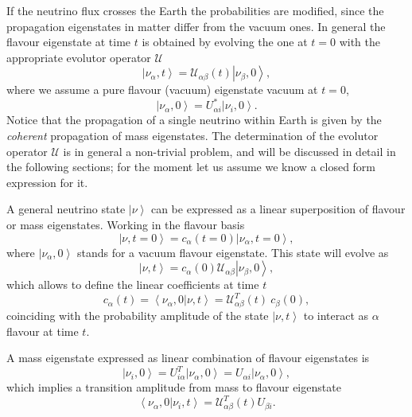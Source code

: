 \documentclass{article}
\newcommand{\ket}[1]{\left| #1 \right>}
\newcommand{\braket}[2]{\left< #1 | #2 \right>}
\begin{document}
If the neutrino flux crosses the Earth the probabilities are modified, since the propagation eigenstates in matter differ from the vacuum ones. In general the flavour eigenstate at time $t$ is  obtained by evolving the one at $t=0$ with the appropriate evolutor operator $\mathcal{U}$
\begin{equation}
	\ket{\nu_\alpha, t} = \mathcal{U}_{\alpha \beta}(t) \ket{\nu_\beta,0},
\end{equation}
where we assume a pure flavour (vacuum) eigenstate vacuum at $t=0$,
\begin{equation}
	\ket{\nu_\alpha, 0} = U_{\alpha i}^* \ket{\nu_i, 0}.
\end{equation}
Notice that the propagation of a single neutrino within Earth is given by the \emph{coherent} propagation of mass eigenstates. The determination of the evolutor operator $\mathcal{U}$ is in general a non-trivial problem, and will be discussed in detail in the following sections; for the moment let us assume we know a closed form expression for it.

A general neutrino state $\ket{\nu}$ can be expressed as a linear superposition of flavour or mass eigenstates. Working in the flavour basis
\begin{equation}
	\ket{\nu, t = 0} = c_\alpha (t=0) \ket{\nu_\alpha, t=0},
\end{equation}
where $\ket{\nu_\alpha, 0}$ stands for a vacuum flavour eigenstate. This state will evolve as
\begin{equation}
	\ket{\nu, t} = c_\alpha(0) \mathcal{U}_{\alpha \beta} \ket{\nu_\beta, 0},
\end{equation}
which allows to define the linear coefficients at time $t$
\begin{equation}
	c_\alpha (t) = \braket{\nu_\alpha, 0}{\nu,t} =  \mathcal{U}_{\alpha \beta}^T (t)\ c_\beta(0),
\end{equation}
coinciding with the probability amplitude of the state $\ket{\nu,t}$ to interact as $\alpha$ flavour at time $t$.

A mass eigenstate expressed as linear combination of flavour eigenstates is
\begin{equation}
	\ket{\nu_i, 0} = U_{i \alpha}^T \ket{\nu_\alpha, 0} = U_{\alpha i} \ket{\nu_\alpha,0},
\end{equation}
which implies a transition amplitude from mass to flavour eigenstate
\begin{equation}
	\braket{\nu_\alpha, 0}{\nu_i, t} = \mathcal{U}_{\alpha \beta}^T (t) U_{\beta i}.
\end{equation}
\end{document}
